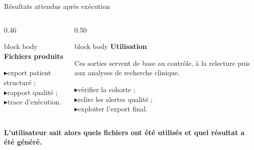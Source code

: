 \documentclass[10pt,aspectratio=169]{beamer}
\newcommand{\smallbullet}{\textcolor{MainBlue}{$\blacktriangleright$}\hspace{0.4em}}
\newenvironment{infobox}[1]
{\begin{beamercolorbox}[rounded=true,shadow=false,wd=\linewidth,sep=0.8em]{block body}
\textbf{\color{DarkBlue}#1}\par\vspace{0.3em}}
{\end{beamercolorbox}}
\begin{document}
\begin{frame}{Résultats attendus après exécution}
\begin{columns}[T,onlytextwidth]
\begin{column}{0.46\linewidth}
\begin{infobox}{Fichiers produits}
\smallbullet export patient structuré ;\\
\smallbullet rapport qualité ;\\
\smallbullet trace d'exécution.
\end{infobox}
\end{column}

\begin{column}{0.50\linewidth}
\begin{infobox}{Utilisation}
Ces sorties servent de base au contrôle, à la relecture puis aux analyses de recherche clinique.

\vspace{0.4em}
\smallbullet vérifier la cohorte ;\\
\smallbullet relire les alertes qualité ;\\
\smallbullet exploiter l'export final.
\end{infobox}
\end{column}
\end{columns}

\vfill
\centering
\textbf{L'utilisateur sait alors quels fichiers ont été utilisés et quel résultat a été généré.}
\end{frame}
\end{document}
